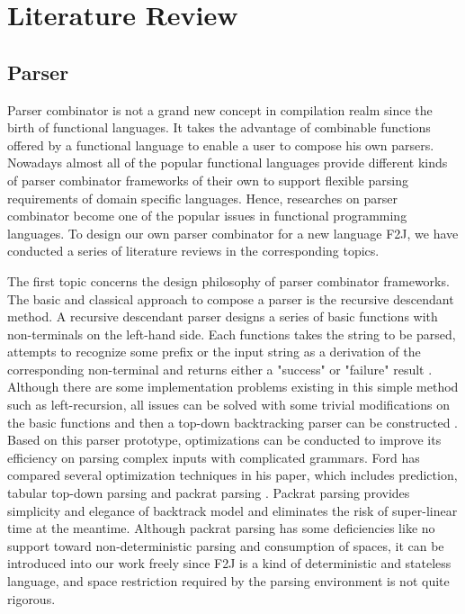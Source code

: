 \chapter{Literature Review}

\section{Parser}

Parser combinator is not a grand new concept in compilation realm since the birth of functional languages. It takes the advantage of combinable functions offered by a functional language to enable a user to compose his own parsers. Nowadays almost all of the popular functional languages provide different kinds of parser combinator frameworks of their own to support flexible parsing requirements of domain specific languages. Hence, researches on parser combinator become one of the popular issues in functional programming languages. To design our own parser combinator for a new language F2J, we have conducted a series of literature reviews in the corresponding topics.

The first topic concerns the design philosophy of parser combinator frameworks. The basic and classical approach to compose a parser is the recursive descendant method. A recursive descendant parser designs a series of basic functions with non-terminals on the left-hand side. Each functions takes the string to be parsed, attempts to recognize some prefix or the input string as a derivation of the corresponding non-terminal and returns either a "success" or "failure" result \cite{Ford2002}. Although there are some implementation problems existing in this simple method such as left-recursion, all issues can be solved with some trivial modifications on the basic functions and then a top-down backtracking parser can be constructed \cite{Compilers:2006}. Based on this parser prototype, optimizations can be conducted to improve its efficiency on parsing complex inputs with complicated grammars. Ford has compared several optimization techniques in his paper, which includes prediction, tabular top-down parsing and packrat parsing \cite{Ford2002}. Packrat parsing provides simplicity and elegance of backtrack model and eliminates the risk of super-linear time at the meantime. Although packrat parsing has some deficiencies like no support toward non-deterministic parsing and consumption of spaces, it can be introduced into our work freely since F2J is a kind of deterministic and stateless language, and space restriction required by the parsing environment is not quite rigorous.

